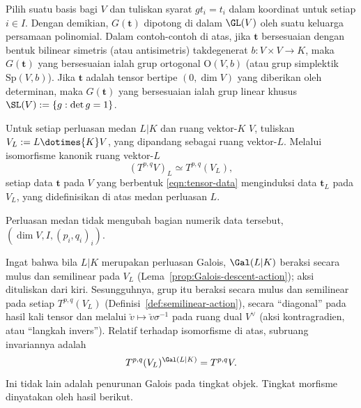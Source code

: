 Pilih suatu basis bagi $V$ dan tuliskan syarat $gt_i=t_i$ dalam koordinat
untuk setiap $i\in I$. Dengan demikian, $G(\mathbf{t})$ dipotong di dalam
$\GL(V)$ oleh suatu keluarga persamaan polinomial. Dalam contoh-contoh di
atas, jika $\mathbf{t}$ bersesuaian dengan bentuk bilinear simetris (atau
antisimetris) takdegenerat $b:V\times V\to K$, maka $G(\mathbf{t})$ yang
bersesuaian ialah grup ortogonal $\mathrm{O}(V,b)$ (atau grup simplektik
$\mathrm{Sp}(V,b)$). Jika $\mathbf{t}$ adalah tensor bertipe
$(0,\dim V)$ yang diberikan oleh determinan, maka $G(\mathbf{t})$ yang
bersesuaian ialah grup linear khusus
$\SL(V):=\{g:\det g=1\}$.

\begin{definition}\label{def:tL}
	Untuk setiap perluasan medan $L|K$ dan ruang vektor-$K$ $V$, tuliskan
	$V_L:=L\dotimes{K}V$, yang dipandang sebagai ruang vektor-$L$. Melalui
	isomorfisme kanonik ruang vektor-$L$
	\[
	(T^{p,q}V)_L\simeq T^{p,q}(V_L),
	\]
	setiap data $\mathbf{t}$ pada $V$ yang berbentuk
	\eqref{eqn:tensor-data} menginduksi data $\mathbf{t}_L$ pada $V_L$, yang
	didefinisikan di atas medan perluasan $L$.
\end{definition}

Perluasan medan tidak mengubah bagian numerik data tersebut,
$(\dim V,I,(p_i,q_i)_i)$.

Ingat bahwa bila $L|K$ merupakan perluasan Galois,
$\Gal(L|K)$ beraksi secara mulus dan semilinear pada $V_L$
(Lema~\ref{prop:Galois-descent-action}); aksi dituliskan dari kiri.
Sesungguhnya, grup itu beraksi secara mulus dan semilinear pada setiap
$T^{p,q}(V_L)$ (Definisi~\ref{def:semilinear-action}), secara ``diagonal''
pada hasil kali tensor dan melalui
$\check v\mapsto\check v\sigma^{-1}$ pada ruang dual $V^\vee$ (aksi
kontragradien, atau ``langkah invers''). Relatif terhadap isomorfisme di atas, subruang invariannya
adalah
\[
T^{p,q}(V_L)^{\Gal(L|K)}=T^{p,q}V.
\]
Ini tidak lain adalah penurunan Galois pada tingkat objek. Tingkat morfisme
dinyatakan oleh hasil berikut.

